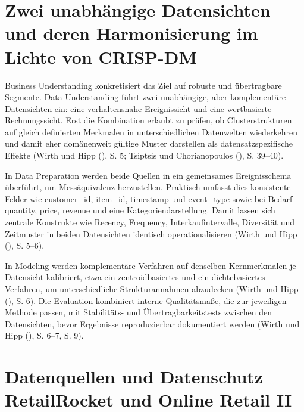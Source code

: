 \documentclass[
  11pt,
  openany, oneside]{book}
\begin{document}
\section{Zwei unabhängige Datensichten und deren Harmonisierung im
Lichte von CRISP-DM}\label{sec-crisp-dm}

Business Understanding konkretisiert das Ziel auf robuste und
übertragbare Segmente. Data Understanding führt zwei unabhängige, aber
komplementäre Datensichten ein: eine verhaltensnahe Ereignissicht und
eine wertbasierte Rechnungssicht. Erst die Kombination erlaubt zu
prüfen, ob Clusterstrukturen auf gleich definierten Merkmalen in
unterschiedlichen Datenwelten wiederkehren und damit eher domänenweit
gültige Muster darstellen als datensatzspezifische Effekte (Wirth und
Hipp (), S. 5;
Tsiptsis und Chorianopoulos
(), S. 39--40).

In Data Preparation werden beide Quellen in ein gemeinsames
Ereignisschema überführt, um Messäquivalenz herzustellen. Praktisch
umfasst dies konsistente Felder wie customer\_id, item\_id, timestamp
und event\_type sowie bei Bedarf quantity, price, revenue und eine
Kategoriendarstellung. Damit lassen sich zentrale Konstrukte wie
Recency, Frequency, Interkaufintervalle, Diversität und Zeitmuster in
beiden Datensichten identisch operationalisieren (Wirth und Hipp
(), S. 5--6).

In Modeling werden komplementäre Verfahren auf denselben Kernmerkmalen
je Datensicht kalibriert, etwa ein zentroidbasiertes und ein
dichtebasiertes Verfahren, um unterschiedliche Strukturannahmen
abzudecken (Wirth und Hipp
(), S. 6). Die
Evaluation kombiniert interne Qualitätsmaße, die zur jeweiligen Methode
passen, mit Stabilitäts- und Übertragbarkeitstests zwischen den
Datensichten, bevor Ergebnisse reproduzierbar dokumentiert werden (Wirth
und Hipp (), S.
6--7, S. 9).

\section{Datenquellen und Datenschutz RetailRocket und Online Retail
II}\label{sec-datenquellen}
\end{document}

